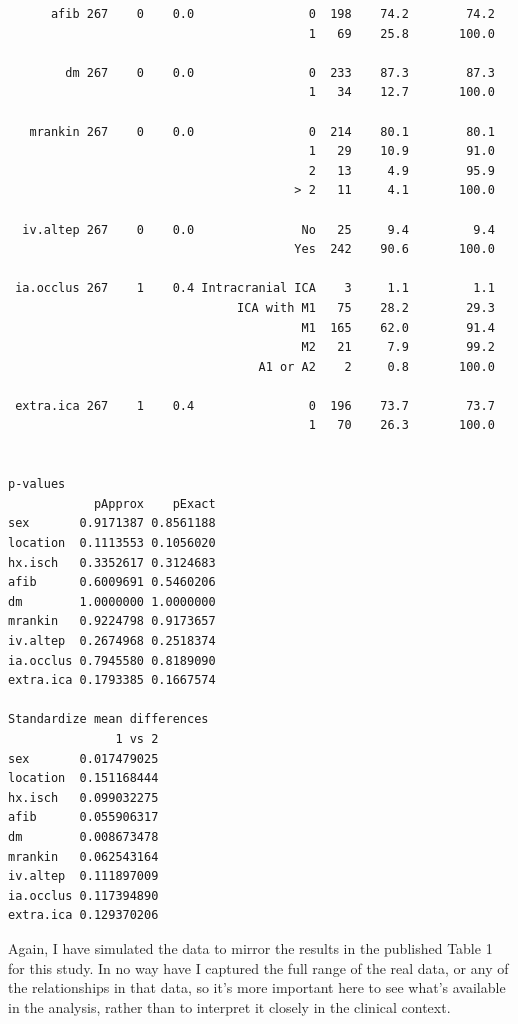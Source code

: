\documentclass[]{book}
\theoremstyle{definition}
\theoremstyle{definition}
\theoremstyle{definition}
\theoremstyle{remark}
\begin{document}
\begin{verbatim}
      afib 267    0    0.0                0  198    74.2        74.2
                                          1   69    25.8       100.0
                                                                    
        dm 267    0    0.0                0  233    87.3        87.3
                                          1   34    12.7       100.0
                                                                    
   mrankin 267    0    0.0                0  214    80.1        80.1
                                          1   29    10.9        91.0
                                          2   13     4.9        95.9
                                        > 2   11     4.1       100.0
                                                                    
  iv.altep 267    0    0.0               No   25     9.4         9.4
                                        Yes  242    90.6       100.0
                                                                    
 ia.occlus 267    1    0.4 Intracranial ICA    3     1.1         1.1
                                ICA with M1   75    28.2        29.3
                                         M1  165    62.0        91.4
                                         M2   21     7.9        99.2
                                   A1 or A2    2     0.8       100.0
                                                                    
 extra.ica 267    1    0.4                0  196    73.7        73.7
                                          1   70    26.3       100.0
                                                                    

p-values
            pApprox    pExact
sex       0.9171387 0.8561188
location  0.1113553 0.1056020
hx.isch   0.3352617 0.3124683
afib      0.6009691 0.5460206
dm        1.0000000 1.0000000
mrankin   0.9224798 0.9173657
iv.altep  0.2674968 0.2518374
ia.occlus 0.7945580 0.8189090
extra.ica 0.1793385 0.1667574

Standardize mean differences
               1 vs 2
sex       0.017479025
location  0.151168444
hx.isch   0.099032275
afib      0.055906317
dm        0.008673478
mrankin   0.062543164
iv.altep  0.111897009
ia.occlus 0.117394890
extra.ica 0.129370206
\end{verbatim}

Again, I have simulated the data to mirror the results in the published
Table 1 for this study. In no way have I captured the full range of the
real data, or any of the relationships in that data, so it's more
important here to see what's available in the analysis, rather than to
interpret it closely in the clinical context.
\end{document}
